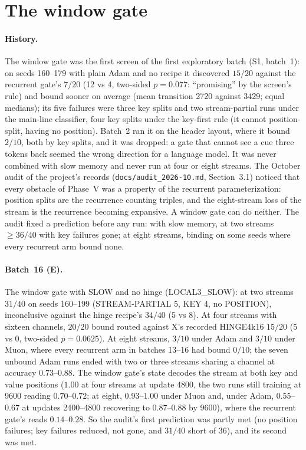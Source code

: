 \documentclass[11pt]{article}
\newcommand{\arm}[1]{\textsf{#1}}
\begin{document}
\section{The window gate}
\label{sec:window}

\paragraph{History.} The window gate was the first screen of the first exploratory batch (S1, batch~1): on seeds 160--179 with plain Adam and no recipe it discovered $15/20$ against the recurrent gate's $7/20$ (12 vs 4, two-sided $p = 0.077$: ``promising'' by the screen's rule) and bound sooner on average (mean transition 2720 against 3429; equal medians); its five failures were three key splits and two stream-partial runs under the main-line classifier, four key splits under the key-first rule (it cannot position-split, having no position). Batch~2 ran it on the header layout, where it bound $2/10$, both by key splits, and it was dropped: a gate that cannot see a cue three tokens back seemed the wrong direction for a language model. It was never combined with slow memory and never run at four or eight streams. The October audit of the project's records (\texttt{docs/audit\_2026-10.md}, Section~3.1) noticed that every obstacle of Phase~V was a property of the recurrent parameterization: position splits are the recurrence counting triples, and the eight-stream loss of the stream is the recurrence becoming expansive. A window gate can do neither. The audit fixed a prediction before any run: with slow memory, at two streams $\geq 36/40$ with key failures gone; at eight streams, binding on some seeds where every recurrent arm bound none.

\paragraph{Batch~16 (E).} The window gate with SLOW and no hinge (\arm{LOCAL3\_SLOW}): at two streams $31/40$ on seeds 160--199 (STREAM-PARTIAL 5, KEY 4, no POSITION), inconclusive against the hinge recipe's $34/40$ (5 vs 8). At four streams with sixteen channels, $20/20$ bound routed against X's recorded \arm{HINGE4k16} $15/20$ (5 vs 0, two-sided $p = 0.0625$). At eight streams, $3/10$ under Adam and $3/10$ under Muon, where every recurrent arm in batches 13--16 had bound $0/10$; the seven unbound Adam runs ended with two or three streams sharing a channel at accuracy $0.73$--$0.88$. The window gate's state decodes the stream at both key and value positions ($1.00$ at four streams at update 4800, the two runs still training at 9600 reading $0.70$--$0.72$; at eight, $0.93$--$1.00$ under Muon and, under Adam, $0.55$--$0.67$ at updates 2400--4800 recovering to $0.87$--$0.88$ by 9600), where the recurrent gate's reads $0.14$--$0.28$. So the audit's first prediction was partly met (no position failures; key failures reduced, not gone, and $31/40$ short of 36), and its second was met.
\end{document}
